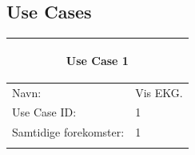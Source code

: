 \subsection{Use Cases}

\begin{table}[H] %
    \begin{tabularx}{\textwidth}{l X}
    \toprule 
    \multicolumn{2}{c}{\begin{large}\textbf{Use Case 1}\end{large}}
 \\ \midrule \addlinespace[1mm]                                                                                                                                                        
     Navn:                  &  Vis EKG. \\ \addlinespace[1mm]                                                                                                                                                       
     Use Case ID:           & 1                                                                                                                                                                                                                                                                                                                                                                                                                                                                                                                                                                                                                         \\ \addlinespace[1mm]                                                                                                                                                       
     Samtidige forekomster: & 1                                                                                                                                                                                                                                                                                                                                                                                                                                                                                                                                                                                                                         \\ \addlinespace[1mm]                                                                                                                                                       

\end{tabularx}
\end{table}
